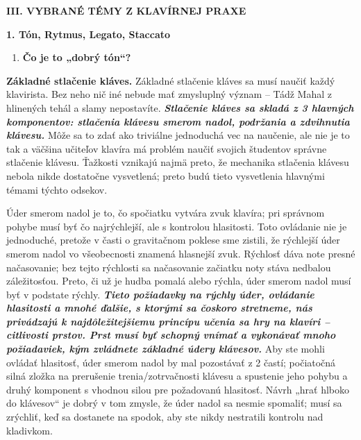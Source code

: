 \documentclass[11pt,a4paper%
]{book}
\begin{document}
\textbf{III. VYBRANÉ TÉMY Z KLAVÍRNEJ PRAXE}

\textbf{1. Tón, Rytmus, Legato, Staccato}

\begin{enumerate}
\def\labelenumi{\alph{enumi}.}
\item
  \textbf{Čo je to „dobrý tón``?}
\end{enumerate}

\textbf{Základné stlačenie kláves.} Základné stlačenie kláves sa musí naučiť každý klavirista. Bez neho nič iné nebude mať zmysluplný význam -- Tádž Mahal z hlinených tehál a slamy nepostavíte. \emph{\textbf{Stlačenie kláves sa skladá z 3 hlavných komponentov: stlačenia klávesu smerom nadol, podržania a zdvihnutia klávesu.}} Môže sa to zdať ako triviálne jednoduchá vec na naučenie, ale nie je to tak a väčšina učiteľov klavíra má problém naučiť svojich študentov správne stlačenie klávesu. Ťažkosti vznikajú najmä preto, že mechanika stlačenia klávesu nebola nikde dostatočne vysvetlená; preto budú tieto vysvetlenia hlavnými témami týchto odsekov.

Úder smerom nadol je to, čo spočiatku vytvára zvuk klavíra; pri správnom pohybe musí byť čo najrýchlejší, ale s kontrolou hlasitosti. Toto ovládanie nie je jednoduché, pretože v časti o gravitačnom poklese sme zistili, že rýchlejší úder smerom nadol vo všeobecnosti znamená hlasnejší zvuk. Rýchlosť dáva note presné načasovanie; bez tejto rýchlosti sa načasovanie začiatku noty stáva nedbalou záležitosťou. Preto, či už je hudba pomalá alebo rýchla, úder smerom nadol musí byť v podstate rýchly. \emph{\textbf{Tieto požiadavky na rýchly úder, ovládanie hlasitosti a mnohé ďalšie, s ktorými sa čoskoro stretneme, nás privádzajú k najdôležitejšiemu princípu učenia sa hry na klavíri -- citlivosti prstov. Prst musí byť schopný vnímať a vykonávať mnoho požiadaviek, kým zvládnete základné údery klávesov.}} Aby ste mohli ovládať hlasitosť, úder smerom nadol by mal pozostávať z 2 častí; počiatočná silná zložka na prerušenie trenia/zotrvačnosti klávesu a spustenie jeho pohybu a druhý komponent s vhodnou silou pre požadovanú hlasitosť. Návrh „hrať hlboko do klávesov`` je dobrý v tom zmysle, že úder nadol sa nesmie spomaliť; musí sa zrýchliť, keď sa dostanete na spodok, aby ste nikdy nestratili kontrolu nad kladivkom.
\end{document}
